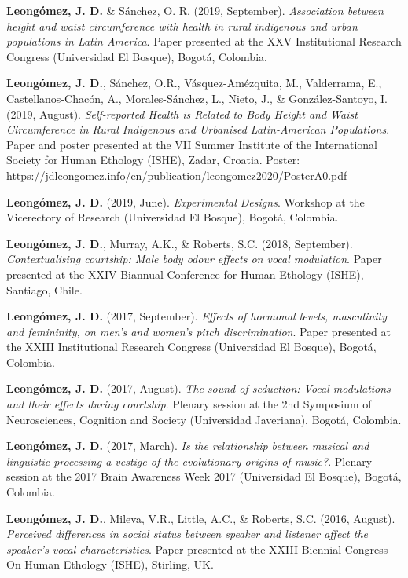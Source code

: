 \documentclass[11pt,a4paper,]{awesome-cv}
\begin{document}
\textbf{Leongómez, J. D.} \& Sánchez, O. R. (2019, September).
\emph{Association between height and waist circumference with health in
rural indigenous and urban populations in Latin America}. Paper
presented at the XXV Institutional Research Congress (Universidad El
Bosque), Bogotá, Colombia.

\textbf{Leongómez, J. D.}, Sánchez, O.R., Vásquez-Amézquita, M.,
Valderrama, E., Castellanos-Chacón, A., Morales-Sánchez, L., Nieto, J.,
\& González-Santoyo, I. (2019, August). \emph{Self-reported Health is
Related to Body Height and Waist Circumference in Rural Indigenous and
Urbanised Latin-American Populations}. Paper and poster presented at the
VII Summer Institute of the International Society for Human Ethology
(ISHE), Zadar, Croatia. Poster:
\url{https://jdleongomez.info/en/publication/leongomez2020/PosterA0.pdf}

\textbf{Leongómez, J. D.} (2019, June). \emph{Experimental Designs}.
Workshop at the Vicerectory of Research (Universidad El Bosque), Bogotá,
Colombia.

\textbf{Leongómez, J. D.}, Murray, A.K., \& Roberts, S.C. (2018,
September). \emph{Contextualising courtship: Male body odour effects on
vocal modulation}. Paper presented at the XXIV Biannual Conference for
Human Ethology (ISHE), Santiago, Chile.

\textbf{Leongómez, J. D.} (2017, September). \emph{Effects of hormonal
levels, masculinity and femininity, on men's and women's pitch
discrimination}. Paper presented at the XXIII Institutional Research
Congress (Universidad El Bosque), Bogotá, Colombia.

\textbf{Leongómez, J. D.} (2017, August). \emph{The sound of seduction:
Vocal modulations and their effects during courtship}. Plenary session
at the 2nd Symposium of Neurosciences, Cognition and Society
(Universidad Javeriana), Bogotá, Colombia.

\textbf{Leongómez, J. D.} (2017, March). \emph{Is the relationship
between musical and linguistic processing a vestige of the evolutionary
origins of music?}. Plenary session at the 2017 Brain Awareness Week
2017 (Universidad El Bosque), Bogotá, Colombia.

\textbf{Leongómez, J. D.}, Mileva, V.R., Little, A.C., \& Roberts, S.C.
(2016, August). \emph{Perceived differences in social status between
speaker and listener affect the speaker's vocal characteristics}. Paper
presented at the XXIII Biennial Congress On Human Ethology (ISHE),
Stirling, UK.
\end{document}

